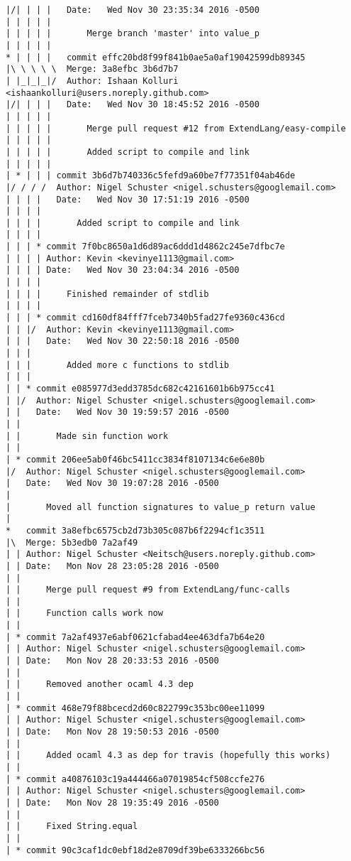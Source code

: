 \begin{lstlisting}
|/| | | |   Date:   Wed Nov 30 23:35:34 2016 -0500
| | | | |   
| | | | |       Merge branch 'master' into value_p
| | | | |        
* | | | |   commit effc20bd8f99f841b0ae5a0af19042599db89345
|\ \ \ \ \  Merge: 3a8efbc 3b6d7b7
| |_|_|_|/  Author: Ishaan Kolluri <ishaankolluri@users.noreply.github.com>
|/| | | |   Date:   Wed Nov 30 18:45:52 2016 -0500
| | | | |   
| | | | |       Merge pull request #12 from ExtendLang/easy-compile
| | | | |       
| | | | |       Added script to compile and link
| | | | |      
| * | | | commit 3b6d7b740336c5fefd9a60be7f77351f04ab46de
|/ / / /  Author: Nigel Schuster <nigel.schusters@googlemail.com>
| | | |   Date:   Wed Nov 30 17:51:19 2016 -0500
| | | |   
| | | |       Added script to compile and link
| | | |     
| | | * commit 7f0bc8650a1d6d89ac6ddd1d4862c245e7dfbc7e
| | | | Author: Kevin <kevinye1113@gmail.com>
| | | | Date:   Wed Nov 30 23:04:34 2016 -0500
| | | | 
| | | |     Finished remainder of stdlib
| | | |     
| | | * commit cd160df84fff7fceb7340b5fad27fe9360c436cd
| | |/  Author: Kevin <kevinye1113@gmail.com>
| | |   Date:   Wed Nov 30 22:50:18 2016 -0500
| | |   
| | |       Added more c functions to stdlib
| | |    
| | * commit e085977d3edd3785dc682c42161601b6b975cc41
| |/  Author: Nigel Schuster <nigel.schusters@googlemail.com>
| |   Date:   Wed Nov 30 19:59:57 2016 -0500
| |   
| |       Made sin function work
| |   
| * commit 206ee5ab0f46bc5411cc3834f8107134c6e6e80b
|/  Author: Nigel Schuster <nigel.schusters@googlemail.com>
|   Date:   Wed Nov 30 19:07:28 2016 -0500
|   
|       Moved all function signatures to value_p return value
|    
*   commit 3a8efbc6575cb2d73b305c087b6f2294cf1c3511
|\  Merge: 5b3edb0 7a2af49
| | Author: Nigel Schuster <Neitsch@users.noreply.github.com>
| | Date:   Mon Nov 28 23:05:28 2016 -0500
| | 
| |     Merge pull request #9 from ExtendLang/func-calls
| |     
| |     Function calls work now
| |   
| * commit 7a2af4937e6abf0621cfabad4ee463dfa7b64e20
| | Author: Nigel Schuster <nigel.schusters@googlemail.com>
| | Date:   Mon Nov 28 20:33:53 2016 -0500
| | 
| |     Removed another ocaml 4.3 dep
| |   
| * commit 468e79f88bcecd2d60c822799c353bc00ee11099
| | Author: Nigel Schuster <nigel.schusters@googlemail.com>
| | Date:   Mon Nov 28 19:50:53 2016 -0500
| | 
| |     Added ocaml 4.3 as dep for travis (hopefully this works)
| |   
| * commit a40876103c19a444466a07019854cf508ccfe276
| | Author: Nigel Schuster <nigel.schusters@googlemail.com>
| | Date:   Mon Nov 28 19:35:49 2016 -0500
| | 
| |     Fixed String.equal
| |   
| * commit 90c3caf1dc0ebf18d2e8709df39be6333266bc56

\end{lstlisting}
